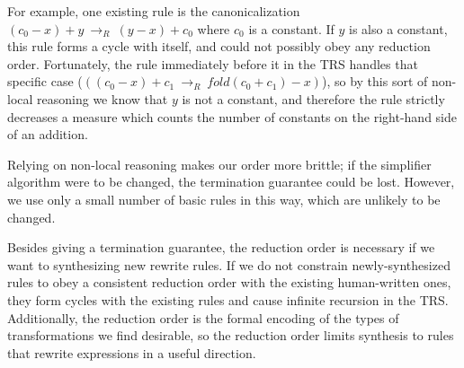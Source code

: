 \documentclass[acmsmall,review,anonymous]{acmart}\settopmatter{printfolios=true,printccs=false,printacmref=false}
\newcommand{\rewrites}[0]{\:\rightarrow_{R}\:}
\begin{document}
For example, one existing rule is the canonicalization $(c_0 - x) + y \rewrites (y - x) + c_0$ where $c_0$ is a constant. If $y$ is also a constant, this rule forms a cycle with itself, and could not possibly obey any reduction order. Fortunately, the rule immediately before it in the TRS handles that specific case ($((c_0 - x) + c_1 \rewrites fold(c_0 + c_1) - x)$), so by this sort of non-local reasoning we know that $y$ is not a constant, and therefore the rule strictly decreases a measure which counts the number of constants on the right-hand side of an addition.





Relying on non-local reasoning makes our order more brittle; if the simplifier algorithm were to be changed, the termination guarantee could be lost. However, we use only a small number of basic rules in this way, which are unlikely to be changed.

Besides giving a termination guarantee, the reduction order is necessary if we want to synthesizing new rewrite rules. If we do not constrain newly-synthesized rules to obey a consistent reduction order with the existing human-written ones, they form cycles with the existing rules and cause infinite recursion in the TRS. Additionally, the reduction order is the formal encoding of the types of transformations we find desirable, so the reduction order limits synthesis to rules that rewrite expressions in a useful direction.
\end{document}
